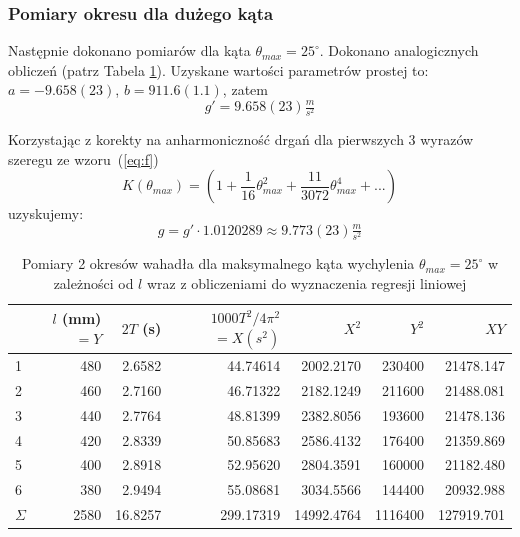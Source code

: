 \documentclass[a4paper]{article}
\newlength{\du}
\begin{document}
\subsubsection{Pomiary okresu dla dużego kąta}

Następnie dokonano pomiarów dla kąta $\theta_{max} = 25^\circ$. 
Dokonano analogicznych obliczeń (patrz Tabela \ref{pomiary_3}).
Uzyskane wartości parametrów prostej to: $a = -9.658(23)$, $b = 911.6(1.1)$,
zatem \[g' = 9.658(23)  \tfrac{m}{s^2}\]

Korzystając z korekty na anharmoniczność drgań dla pierwszych 3 wyrazów szeregu ze wzoru~(\ref{eq:f})
\[ K(\theta_{max}) = \left( 1 + \frac{1}{16}\theta^2_{max} + \frac{11}{3072}\theta^4_{max} + ... \right) \]
uzyskujemy: \[ g = g' \cdot 1.0120289 \approx 9.773(23) \tfrac{m}{s^2}\]



\begin{table}[h]
\centering

	\begin{tabular}{lrrrrrr}
	\toprule
		{} & $l$ (mm) $=Y$ &  $2T$ (s) & \small$1000T^2/4\pi^2$\normalsize$=X (s^2)$ & $X^2$ & $Y^2$ & $XY$ \\
	\midrule
	1 &     480 &  2.6582 &  44.74614 &  2002.2170 &  230400 &  21478.147 \\
	2 &     460 &  2.7160 &  46.71322 &  2182.1249 &  211600 &  21488.081 \\
	3 &     440 &  2.7764 &  48.81399 &  2382.8056 &  193600 &  21478.136 \\
	4 &     420 &  2.8339 &  50.85683 &  2586.4132 &  176400 &  21359.869 \\
	5 &     400 &  2.8918 &  52.95620 &  2804.3591 &  160000 &  21182.480 \\
	6 &     380 &  2.9494 &  55.08681 &  3034.5566 &  144400 &  20932.988 \\
	\midrule
	$\Sigma$ & 2580 & 16.8257 & 299.17319& 14992.4764 & 1116400 & 127919.701 \\
	\bottomrule
	\end{tabular}
	
\caption{Pomiary 2 okresów wahadła dla maksymalnego kąta wychylenia $\theta_{max} = 25^\circ$ w  zależności od $l$ wraz z obliczeniami do wyznaczenia regresji liniowej}
\label{pomiary_3}
\end{table}
\end{document}

